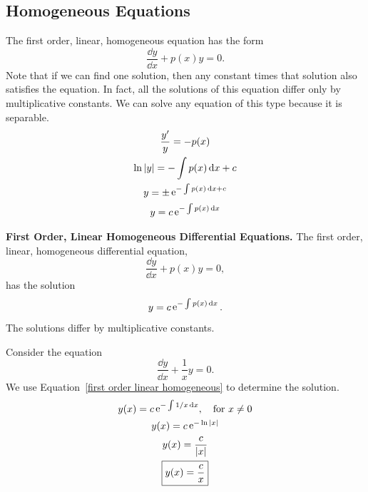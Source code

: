 \subsection{Homogeneous Equations}




The first order, linear, homogeneous equation has the form
\[ 
\frac{\dd y}{\dd x} + p(x) y = 0.
\]
Note that if we can find one solution, then any constant times that solution
also satisfies the equation.  In fact, all the solutions of this 
equation differ only by multiplicative constants.
We can solve any equation of this type because it is separable.
\begin{gather*}
  \frac{y'}{y} = - p(x) 
  \\
  \ln |y| = - \int p(x) \,\mathrm{d} x + c 
  \\
  y = \pm \mathop{\mathrm{e}}\nolimits^{- \int p(x) \,\mathrm{d} x + c} 
  \\
  y = c \mathop{\mathrm{e}}\nolimits^{- \int p(x) \,\mathrm{d} x}
\end{gather*}




\begin{Result}
  \textbf{First Order, Linear Homogeneous Differential Equations.}
  The first order, linear, homogeneous differential equation,
  \[ 
  \frac{\dd y}{\dd x} + p(x) y = 0,
  \]
  has the solution
  \begin{equation}
    \label{first order linear homogeneous}
    y = c \mathop{\mathrm{e}}\nolimits^{- \int p(x) \,\mathrm{d} x}.
  \end{equation}
  The solutions differ by multiplicative constants.  
\end{Result}







\begin{Example}  
  Consider the equation
  \[ 
  \frac{\dd y}{\dd x} + \frac{1}{x} y = 0.
  \]
  We use Equation~\ref{first order linear homogeneous} to determine 
  the solution.
  \begin{gather*}
    y(x) = c \mathop{\mathrm{e}}\nolimits^{ - \int 1/x \,\mathrm{d} x }, \quad \mathrm{for}\ x \neq 0
    \\
    y(x) = c \mathop{\mathrm{e}}\nolimits^{ - \ln |x| }
    \\
    y(x) = \frac{c}{|x|}
    \\
    \boxed{
      y(x) = \frac{c}{x}
      }
  \end{gather*}
\end{Example}
















